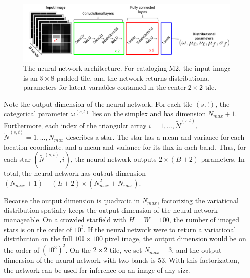 
\begin{figure}[!tb]
    \centering
    \includegraphics[width=\textwidth]{figures/vi_figures/starnet_archetecture4.png}
    \caption{The neural network architecture. For cataloging M2, the input image is an $8\times 8$ padded tile, and the network returns distributional parameters for latent variables contained in the center $2\times 2$ tile.\\
    }
    \label{fig:starnet_arch}
\end{figure}

Note the output dimension of the neural network. For each tile $(s,t)$, the categorical parameter $\omega^{(s,t)}$
lies on the simplex and has dimension $N_{max} + 1$. 
Furthermore, each index of the triangular array
$i = 1, ..., \tilde N^{(s,t)}$, $\tilde N^{(s,t)} = 1, ..., N_{max}$
describes a star. The star has a mean and variance for each location coordinate, and a mean and variance for its flux in each band. 
Thus, for each star $(\tilde N^{(s,t)}, i)$, 
the neural network outputs $2 \times (B + 2)$ parameters. 
In total, the neural network has output dimension $(N_{max} + 1) + (B + 2) \times (N_{max}^2 + N_{max})$. 


Because the output dimension is quadratic in $N_{max}$, factorizing the variational distribution spatially keeps the output dimension of the neural network manageable.
On a crowded starfield with $H = W = 100$, the number of imaged stars is on the order of $10^3$.
If the neural network were to return a variational distribution on the full $100\times 100$ pixel image, the output dimension would be on the order of $(10^3)^2$. 
On the $2\times 2$ tile, we set $N_{max} = 3$, and the output dimension of the neural network with two bands is 53. 
With this factorization, the network can be used for inference on an image of any size. 


